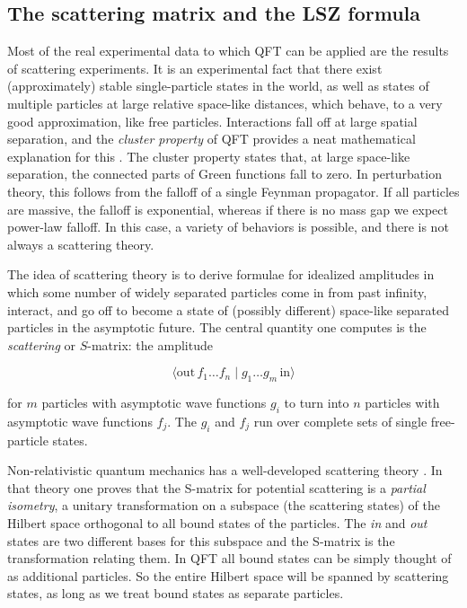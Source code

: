 \subsection{The scattering matrix and the LSZ formula}

Most of the real experimental data to which QFT can be applied are the results of
scattering experiments. It is an experimental fact that there exist (approximately) stable
single-particle states in the world, as well as states of multiple particles at large relative
space-like distances, which behave, to a very good approximation, like free particles.
Interactions fall off at large spatial separation, and the \emph{cluster property} of QFT provides
a neat mathematical explanation for this \cite{banks-ref-16,banks-ref-17}. The cluster property states that, at
large space-like separation, the connected parts of Green functions fall to zero. In
perturbation theory, this follows from the falloff of a single Feynman propagator. If
all particles are massive, the falloff is exponential, whereas if there is no mass gap we
expect power-law falloff. In this case, a variety of behaviors is possible, and there is not
always a scattering theory.

The idea of scattering theory is to derive formulae for idealized amplitudes in which
some number of widely separated particles come in from past infinity, interact, and
go off to become a state of (possibly different) space-like separated particles in the
asymptotic future. The central quantity one computes is the \emph{scattering} or $S$-matrix: the
amplitude

\[
\langle \mathrm{out}\,f_1\ldots f_n\mid g_1\ldots g_m\,\mathrm{in}\rangle
\]

for $m$ particles with asymptotic wave functions $g_i$ to turn into $n$ particles with asymptotic
wave functions $f_j$. The $g_i$ and $f_j$ run over complete sets of single free-particle states.

Non-relativistic quantum mechanics has a well-developed scattering theory \cite{banks-ref-18,banks-ref-19}.
In that theory one proves that the S-matrix for potential scattering is a \emph{partial isometry},
a unitary transformation on a subspace (the scattering states) of the Hilbert space
orthogonal to all bound states of the particles. The \emph{in} and \emph{out} states are two different
bases for this subspace and the S-matrix is the transformation relating them. In QFT
all bound states can be simply thought of as additional particles. So the entire Hilbert
space will be spanned by scattering states, as long as we treat bound states as separate
particles.


